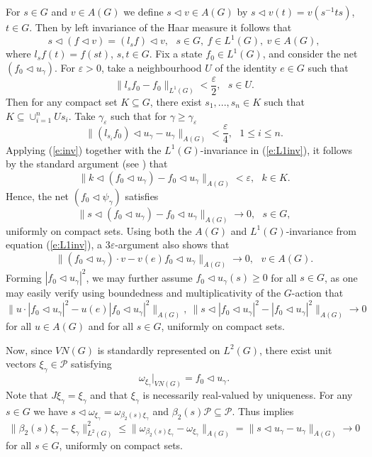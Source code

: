 \documentclass[preprint,12pt]{elsarticle}
\newcommand{\mc}[1]{\mathcal{#1}}
\newcommand{\LG}{VN(G)}
\newcommand{\LO}{L^1(G)}
\newcommand{\LT}{L^2(G)}
\newcommand{\om}{\omega}
\providecommand{\norm}[1]{\lVert#1\rVert}
\begin{document}
\begin{pf}
For $s\in G$ and $v\in A(G)$ we define $s\lhd v\in A(G)$ by $s\lhd v(t)=v(s^{-1}ts)$, $t\in G$. Then by left invariance of the Haar measure it follows that
\begin{equation}\label{e:inv}s\lhd(f\lhd v)=(l_sf)\lhd v, \ \ \ s\in G, \ f\in\LO, \ v\in A(G),\end{equation}
where $l_sf(t)=f(st)$, $s,t\in G$. Fix a state $f_0\in\LO$, and consider the net $(f_0\lhd u_\gamma)$. For $\varepsilon>0$, take a neighbourhood $U$ of the identity $e\in G$ such that
$$\norm{l_sf_0-f_0}_{\LO}<\frac{\varepsilon}{2},  \ \ \ s\in U.$$
Then for any compact set $K\subseteq G$, there exist $s_1,...,s_n\in K$ such that $K\subseteq\cup_{i=1}^n Us_i$. Take $\gamma_\varepsilon$ such that for $\gamma\geq\gamma_\varepsilon$
\begin{equation*}\norm{(l_{s_i}f_0)\lhd u_\gamma-u_\gamma}_{A(G)}<\frac{\varepsilon}{4}, \ \ \ 1\leq i\leq n.\end{equation*}
Applying (\ref{e:inv}) together with the $\LO$-invariance in (\ref{e:L1inv}), it follows by the standard argument (see \cite[Lemma 7.1.1]{R1}) that
$$\norm{k\lhd(f_0\lhd u_\gamma)-f_0\lhd u_\gamma}_{A(G)}<\varepsilon, \ \ \ k\in K.$$
Hence, the net $(f_0\lhd\psi_\gamma)$ satisfies
$$\norm{s\lhd(f_0\lhd u_\gamma)-f_0\lhd u_\gamma}_{A(G)}\rightarrow 0, \ \ \ s\in G,$$
uniformly on compact sets. Using both the $A(G)$ and $\LO$-invariance from equation (\ref{e:L1inv}), a $3\varepsilon$-argument also shows that
$$\norm{(f_0\lhd u_\gamma)\cdot v-v(e)f_0\lhd u_\gamma}_{A(G)}\rightarrow 0, \ \ \ v\in A(G).$$
Forming $|f_0\lhd u_\gamma|^2$, we may further assume $f_0\lhd u_\gamma(s)\geq0$ for all $s\in G$, as one may easily verify using boundedness and multiplicativity of the $G$-action that
$$\norm{u\cdot|f_0\lhd u_\gamma|^2-u(e)|f_0\lhd u_\gamma|^2}_{A(G)}, \ \norm{s\lhd|f_0\lhd u_\gamma|^2-|f_0\lhd u_\gamma|^2}_{A(G)}\rightarrow0$$
for all $u\in A(G)$ and for all $s\in G$, uniformly on compact sets.

Now, since $\LG$ is standardly represented on $\LT$, there exist unit vectors $\xi_\gamma\in\mc{P}$ satisfying
$$\om_{\xi_\gamma}|_{\LG}=f_0\lhd u_\gamma.$$
Note that $J\xi_\gamma=\xi_\gamma$ and that $\xi_\gamma$ is necessarily real-valued by uniqueness. For any $s\in G$ we have $s\lhd\om_{\xi_\gamma}=\om_{\beta_2(s)\xi_\gamma}$ and $\beta_2(s)\mc{P}\subseteq\mc{P}$. Thus \cite[Lemma 2.10]{H} implies
\begin{equation}\label{e:uni}\norm{\beta_2(s)\xi_\gamma-\xi_\gamma}_{\LT}^2\leq\norm{\om_{\beta_2(s)\xi_\gamma}-\om_{\xi_\gamma}}_{A(G)}= \norm{s\lhd u_\gamma- u_\gamma}_{A(G)}\rightarrow0\end{equation}
for all $s\in G$, uniformly on compact sets.


\end{pf}
\end{document}
